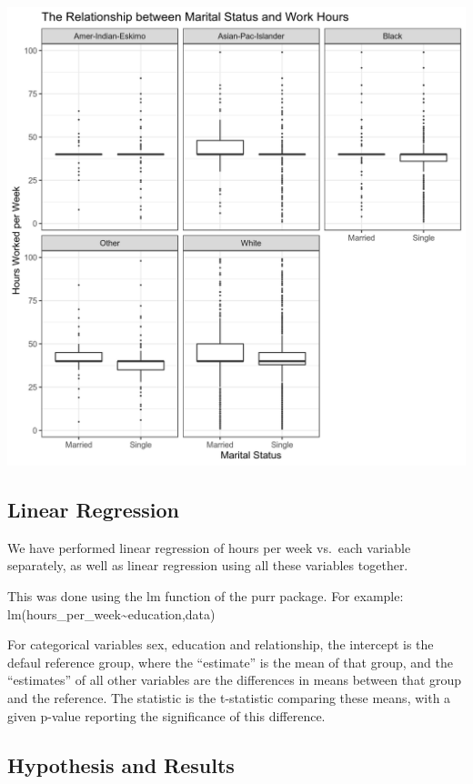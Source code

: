 \documentclass[]{article}
\begin{document}
\includegraphics{../images/Plot_4_Marital_Status_and_Work_Hours.png}

\hypertarget{linear-regression}{%
\subsection{Linear Regression}\label{linear-regression}}

We have performed linear regression of hours per week vs.~each variable
separately, as well as linear regression using all these variables
together.

This was done using the lm function of the purr package. For example:
lm(hours\_per\_week\textasciitilde{}education,data)

For categorical variables sex, education and relationship, the intercept
is the defaul reference group, where the ``estimate'' is the mean of
that group, and the ``estimates'' of all other variables are the
differences in means between that group and the reference. The statistic
is the t-statistic comparing these means, with a given p-value reporting
the significance of this difference.

\hypertarget{hypothesis-and-results}{%
\subsection{Hypothesis and Results}\label{hypothesis-and-results}}
\end{document}
